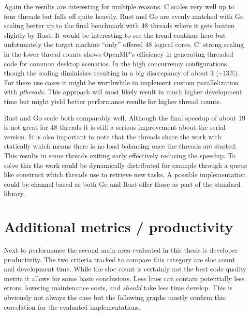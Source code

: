 Again the results are interesting for multiple reasons. C scales very well up to four threads but falls off quite heavily. Rust and Go are evenly matched with Go scaling better up to the final benchmark with 48 threads where it gets beaten slightly by Rust. It would be interesting to see the trend continue here but unfotunately the target machine ``only'' offered 48 logical cores. C' strong scaling in the lower thread counts shows OpenMP's efficiency in generating threaded code for common desktop scenarios. In the high concurrency configurations though the scaling diminishes resulting in a big discrepancy of about 3 (\textasciitilde13\%). For these use cases it might be worthwhile to implement custom parallelization with \textit{pthreads}. This approach will most likely result in much higher development time but might yield better performance results for higher thread counts.

Rust and Go scale both comparably well. Although the final speedup of about 19 is not great for 48 threads it is still a serious improvement about the serial version. It is also important to note that the threads share the work with statically which means there is no load balancing once the threads are started. This results in some threads exiting early effectively reducing the speedup. To solve this the work could be dynamically distributed for example through a queue like construct which threads use to retrieve new tasks. A possible implementation could be channel based as both Go and Rust offer those as part of the standard library.

\section{Additional metrics / productivity}
\label{sec:Evaluation::Metrics}

Next to performance the second main area evaluated in this thesis is developer productivity. The two criteria tracked to compare this category are \gls{sloc} count and development time. While the \gls{sloc} count is certainly not the best code quality metric it allows for some basic conclusions. Less lines can contain potentially less errors, lowering maintenance costs, and \textit{should} take less time develop. This is obviously not always the case but the following graphs mostly confirm this correlation for the evaluated implementations.

